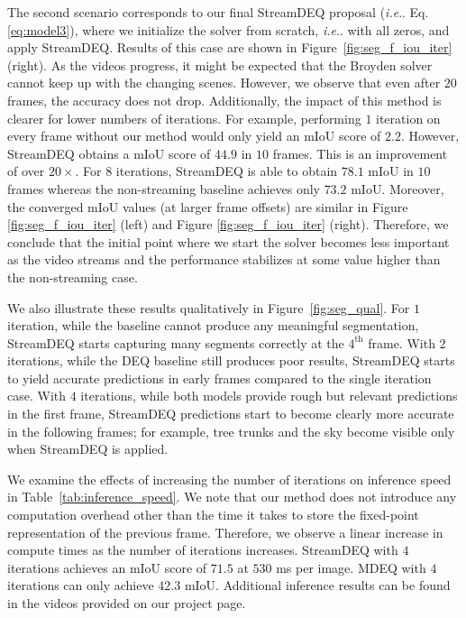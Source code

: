\documentclass[runningheads]{llncs}
\makeatletter
\DeclareRobustCommand\onedot{\futurelet\@let@token\@onedot}
\def\@onedot{\ifx\@let@token.\else.\null\fi\xspace}
\def\ie{\emph{i.e}\onedot} \def\Ie{\emph{I.e}\onedot}
\makeatother
\begin{document}
The second scenario corresponds to our final StreamDEQ proposal (\ie Eq. \ref{eq:model3}), where we initialize the solver from scratch, \ie with all zeros, and apply StreamDEQ. Results of this case are shown in Figure~\ref{fig:seg_f_iou_iter} (right). As the videos progress, it might be expected that the Broyden solver cannot keep up with the changing scenes. However, we observe that even after $20$ frames, the accuracy does not drop. Additionally, the impact of this method is clearer for lower numbers of iterations. For example, performing $1$ iteration on every frame without our method would only yield an mIoU score of $2.2$. However, StreamDEQ obtains a mIoU score of $44.9$ in $10$ frames. This is an improvement of over $20\times$. For $8$ iterations, StreamDEQ is able to obtain $78.1$ mIoU in $10$ frames whereas the non-streaming baseline achieves  only $73.2$ mIoU. Moreover, the converged mIoU values (at larger frame offsets) are similar in Figure \ref{fig:seg_f_iou_iter} (left) and Figure \ref{fig:seg_f_iou_iter} (right). Therefore, we conclude that the initial point where we start the solver becomes less important as the video streams and the performance stabilizes at some value higher than the non-streaming case.


We also illustrate these results qualitatively in Figure~\ref{fig:seg_qual}. For $1$ iteration, while the baseline cannot produce any meaningful segmentation, StreamDEQ starts capturing many segments correctly at the $4^\mathrm{th}$ frame. With $2$ iterations, while the DEQ baseline still produces poor results, StreamDEQ starts to yield accurate predictions in early frames compared to the single iteration case. With $4$ iterations, while both models provide rough but relevant predictions in the first frame, StreamDEQ predictions start to become clearly more accurate in the following frames; for example, tree trunks and the sky become visible only when StreamDEQ is applied.


We examine the effects of increasing the number of iterations on inference speed in Table~\ref{tab:inference_speed}. We note that our method does not introduce any computation overhead other than the time it takes to store the fixed-point representation of the previous frame. Therefore, we observe a linear increase in compute times as the number of iterations increases. StreamDEQ with $4$ iterations achieves an mIoU score of $71.5$ at $530$ ms per image. MDEQ with $4$ iterations can only achieve $42.3$ mIoU. Additional inference results can be found in the videos provided on our project page.
\end{document}
